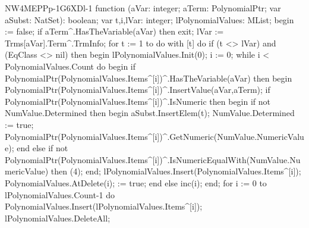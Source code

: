 {NW4MEPPp-1G6XDl-1}\nwendcode{}\nwdocspar
\nwenddocs{}\endmoddef\nwstartdeflinemarkup{}\nwenddeflinemarkup
function (aVar: integer;
                            aTerm: PolynomialPtr;
                            var aSubst: NatSet): boolean;
var
   t,i,lVar: integer;
   lPolynomialValues: MList;
begin
    := false;
   if aTerm^.HasTheVariable(aVar) then exit;
   lVar := Trms[aVar].Term^.TrmInfo;
   for t := 1 to  do
      with [t] do
         if (t <> lVar) and (EqClass <> nil) then
         begin
            lPolynomialValues.Init(0);
            i := 0;
            while i < PolynomialValues.Count do
            begin
               if PolynomialPtr(PolynomialValues.Items^[i])^.HasTheVariable(aVar) then
               begin
                  PolynomialPtr(PolynomialValues.Items^[i])^.InsertValue(aVar,aTerm);
                  if PolynomialPtr(PolynomialValues.Items^[i])^.IsNumeric then
                  begin
                     if not NumValue.Determined then
                     begin
                        aSubst.InsertElem(t);
                        NumValue.Determined := true;
                        PolynomialPtr(PolynomialValues.Items^[i])^.GetNumeric(NumValue.NumericValue);
                     end
                     else if not PolynomialPtr(PolynomialValues.Items^[i])^.IsNumericEqualWith(NumValue.NumericValue) then
                        (4);
                  end;
                  lPolynomialValues.Insert(PolynomialValues.Items^[i]);
                  PolynomialValues.AtDelete(i);
                   := true;
               end else inc(i);
            end;
            for i := 0 to lPolynomialValues.Count-1 do
               PolynomialValues.Insert(lPolynomialValues.Items^[i]);
            lPolynomialValues.DeleteAll;
